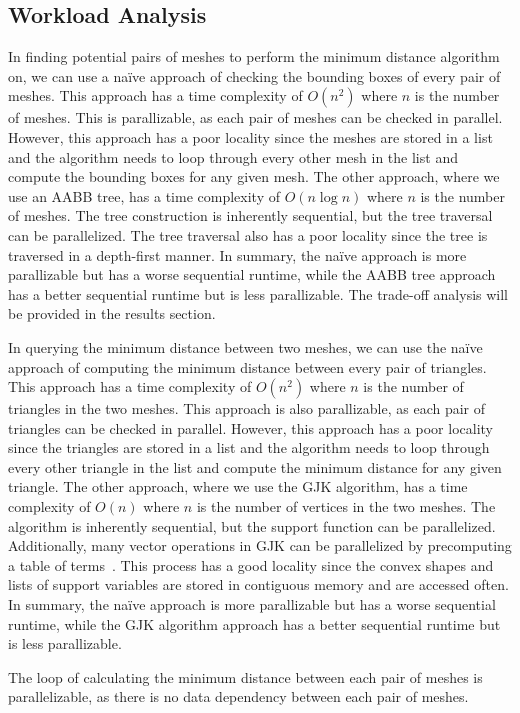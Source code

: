\documentclass[12pt,fleqn]{article}
\begin{document}
\subsection{Workload Analysis}
In finding potential pairs of meshes to perform the minimum distance algorithm on, we can use a naïve approach of checking the bounding boxes of every pair of meshes. This approach has a time complexity of $O(n^2)$ where $n$ is the number of meshes. This is parallizable, as each pair of meshes can be checked in parallel. However, this approach has a poor locality since the meshes are stored in a list and the algorithm needs to loop through every other mesh in the list and compute the bounding boxes for any given mesh.
The other approach, where we use an AABB tree, has a time complexity of $O(n \log n)$ where $n$ is the number of meshes. The tree construction is inherently sequential, but the tree traversal can be parallelized. The tree traversal also has a poor locality since the tree is traversed in a depth-first manner. In summary, the naïve approach is more parallizable but has a worse sequential runtime, while the AABB tree approach has a better sequential runtime but is less parallizable. The trade-off analysis will be provided in the results section.

In querying the minimum distance between two meshes, we can use the naïve approach of computing the minimum distance between every pair of triangles. This approach has a time complexity of $O(n^2)$ where $n$ is the number of triangles in the two meshes. This approach is also parallizable, as each pair of triangles can be checked in parallel. However, this approach has a poor locality since the triangles are stored in a list and the algorithm needs to loop through every other triangle in the list and compute the minimum distance for any given triangle.
The other approach, where we use the GJK algorithm, has a time complexity of $O(n)$ where $n$ is the number of vertices in the two meshes. The algorithm is inherently sequential, but the support function can be parallelized. Additionally, many vector operations in GJK can be parallelized by precomputing a table of terms~\cite{bittle_2010}. This process has a good locality since the convex shapes and lists of support variables are stored in contiguous memory and are accessed often. In summary, the naïve approach is more parallizable but has a worse sequential runtime, while the GJK algorithm approach has a better sequential runtime but is less parallizable.

The loop of calculating the minimum distance between each pair of meshes is parallelizable, as there is no data dependency between each pair of meshes.
\end{document}
